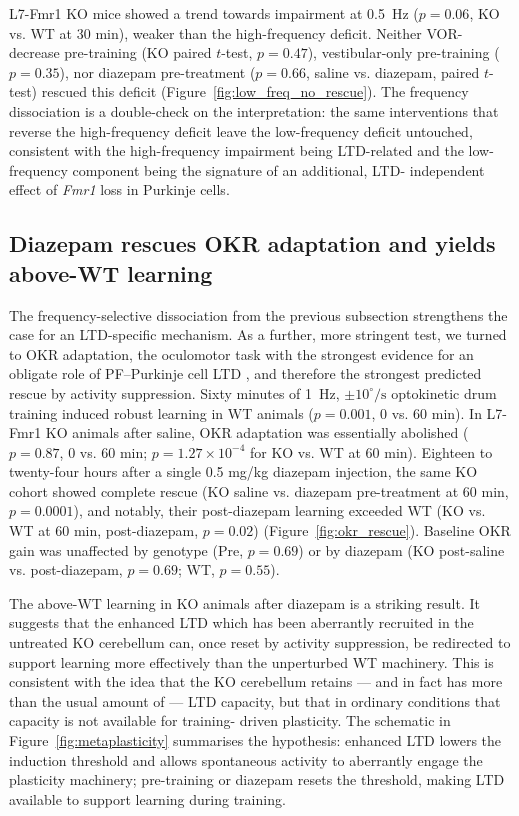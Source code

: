 \documentclass[11pt]{article}
\begin{document}
L7-Fmr1 KO mice showed a trend towards impairment at 0.5~Hz ($p = 0.06$,
KO vs. WT at 30 min), weaker than the high-frequency deficit. Neither
VOR-decrease pre-training (KO paired $t$-test, $p = 0.47$),
vestibular-only pre-training ($p = 0.35$), nor diazepam pre-treatment
($p = 0.66$, saline vs. diazepam, paired $t$-test) rescued this deficit
(Figure~\ref{fig:low_freq_no_rescue}). The frequency dissociation is a
double-check on the interpretation: the same interventions that reverse
the high-frequency deficit leave the low-frequency deficit untouched,
consistent with the high-frequency impairment being LTD-related and the
low-frequency component being the signature of an additional, LTD-
independent effect of \textit{Fmr1} loss in Purkinje cells.

\subsection{Diazepam rescues OKR adaptation and yields above-WT learning}

The frequency-selective dissociation from the previous subsection
strengthens the case for an LTD-specific mechanism. As a further, more
stringent test, we turned to OKR adaptation, the oculomotor task with the
strongest evidence for an obligate role of PF--Purkinje cell LTD \citep{inoshita2018okr,
takeuchi2008delphilin}, and therefore the strongest predicted rescue by
activity suppression. Sixty minutes of 1~Hz, $\pm 10^{\circ}/\text{s}$
optokinetic drum training induced robust learning in WT animals
($p = 0.001$, 0 vs. 60 min). In L7-Fmr1 KO animals after saline, OKR
adaptation was essentially abolished ($p = 0.87$, 0 vs. 60 min;
$p = 1.27 \times 10^{-4}$ for KO vs. WT at 60 min). Eighteen to twenty-four
hours after a single 0.5 mg/kg diazepam injection, the same KO cohort
showed complete rescue (KO saline vs. diazepam pre-treatment at 60 min,
$p = 0.0001$), and notably, their post-diazepam learning exceeded WT
(KO vs. WT at 60 min, post-diazepam, $p = 0.02$)
(Figure~\ref{fig:okr_rescue}). Baseline OKR gain was unaffected by
genotype (Pre, $p = 0.69$) or by diazepam (KO post-saline vs.
post-diazepam, $p = 0.69$; WT, $p = 0.55$).

The above-WT learning in KO animals after diazepam is a striking result.
It suggests that the enhanced LTD which has been aberrantly recruited in
the untreated KO cerebellum can, once reset by activity suppression, be
redirected to support learning more effectively than the unperturbed WT
machinery. This is consistent with the idea that the KO cerebellum retains
--- and in fact has more than the usual amount of --- LTD capacity, but
that in ordinary conditions that capacity is not available for training-
driven plasticity. The schematic in
Figure~\ref{fig:metaplasticity} summarises the hypothesis: enhanced
LTD lowers the induction threshold and allows spontaneous activity to
aberrantly engage the plasticity machinery; pre-training or diazepam
resets the threshold, making LTD available to support learning during
training.
\end{document}
